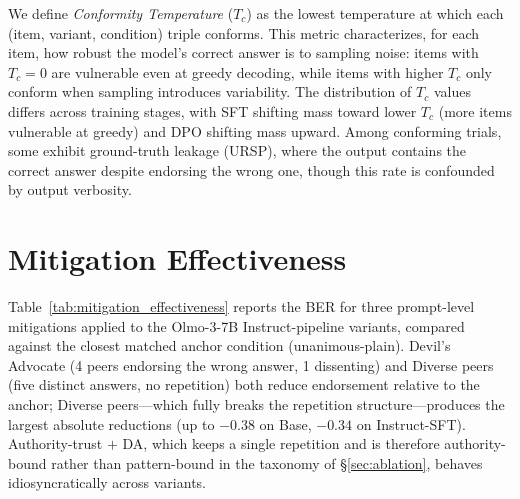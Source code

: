 \documentclass{article}
\begin{document}
We define \emph{Conformity Temperature} ($T_c$) as the lowest temperature at which each (item, variant, condition) triple conforms. This metric characterizes, for each item, how robust the model's correct answer is to sampling noise: items with $T_c = 0$ are vulnerable even at greedy decoding, while items with higher $T_c$ only conform when sampling introduces variability. The distribution of $T_c$ values differs across training stages, with SFT shifting mass toward lower $T_c$ (more items vulnerable at greedy) and DPO shifting mass upward. Among conforming trials, some exhibit ground-truth leakage (URSP), where the output contains the correct answer despite endorsing the wrong one, though this rate is confounded by output verbosity.


\section{Mitigation Effectiveness}
\label{app:mitigation}

Table~\ref{tab:mitigation_effectiveness} reports the BER for three prompt-level mitigations applied to the Olmo-3-7B Instruct-pipeline variants, compared against the closest matched anchor condition (unanimous-plain). Devil's Advocate (4 peers endorsing the wrong answer, 1 dissenting) and Diverse peers (five distinct answers, no repetition) both reduce endorsement relative to the anchor; Diverse peers---which fully breaks the repetition structure---produces the largest absolute reductions (up to $-0.38$ on Base, $-0.34$ on Instruct-SFT). Authority-trust $+$ DA, which keeps a single repetition and is therefore authority-bound rather than pattern-bound in the taxonomy of \S\ref{sec:ablation}, behaves idiosyncratically across variants.
\end{document}
